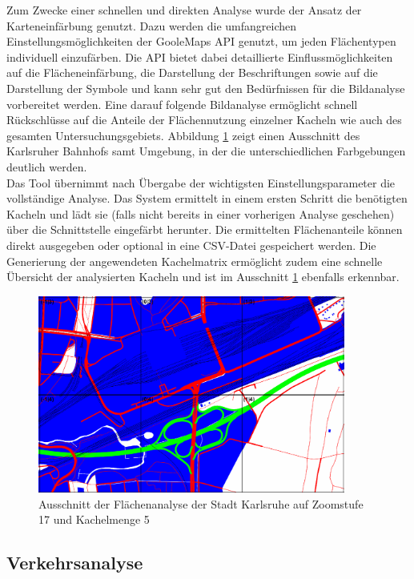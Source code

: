 Zum Zwecke einer schnellen und direkten Analyse wurde der Ansatz der Karteneinfärbung genutzt. Dazu werden die umfangreichen Einstellungsmöglichkeiten der GooleMaps API genutzt, um jeden Flächentypen individuell einzufärben. Die API bietet dabei detaillierte Einflussmöglichkeiten auf die Flächeneinfärbung, die Darstellung der Beschriftungen sowie auf die Darstellung der Symbole und kann sehr gut den Bedürfnissen für die Bildanalyse vorbereitet werden. Eine darauf folgende Bildanalyse ermöglicht schnell Rückschlüsse auf die Anteile der Flächennutzung einzelner Kacheln wie auch des gesamten Untersuchungsgebiets. Abbildung \ref{fig:ka_area_analysis} zeigt einen Ausschnitt des Karlsruher Bahnhofs samt Umgebung, in der die unterschiedlichen Farbgebungen deutlich werden.\\

Das Tool übernimmt nach Übergabe der wichtigsten Einstellungsparameter die vollständige Analyse. Das System ermittelt in einem ersten Schritt die benötigten Kacheln und lädt sie (falls nicht bereits in einer vorherigen Analyse geschehen) über die Schnittstelle eingefärbt herunter. Die ermittelten Flächenanteile können direkt ausgegeben oder optional in eine CSV-Datei gespeichert werden. Die Generierung der angewendeten Kachelmatrix ermöglicht zudem eine schnelle Übersicht der analysierten Kacheln und ist im Ausschnitt \ref{fig:ka_area_analysis} ebenfalls erkennbar.

\begin{figure}
  \centering
    \includegraphics[width=0.9\textwidth]{images/karlsruhe_area_analysis_ausschnitt.png}
    \caption{Ausschnitt der Flächenanalyse der Stadt Karlsruhe auf Zoomstufe 17 und Kachelmenge 5}
    \label{fig:ka_area_analysis}
\end{figure}

\subsection{Verkehrsanalyse}
\label{sec:traffic-analysis}

